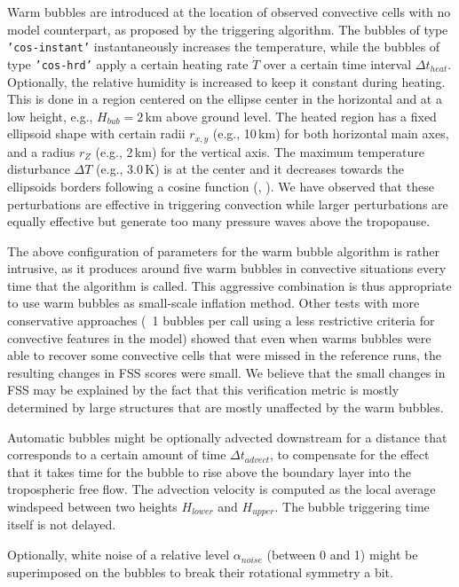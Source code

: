 \documentclass[10pt,a4paper,twoside,headinclude,footinclude,parskip=half]{scrartcl}
\newcommand{\citeNPK}[1]{\citeauthor{#1}, \citeyear{#1}}
\newcommand{\srcform}[1]{\mbox{\texttt{#1}}\xspace}%
\begin{document}
Warm bubbles are introduced at the location of observed convective cells with no model counterpart,
as proposed by the triggering algorithm. The bubbles of type \srcform{'cos-instant'} instantaneously increases
the temperature, while the bubbles of type \srcform{'cos-hrd'} apply a certain heating
rate $\dot{T}$ over a certain time interval $\Delta t_{heat}$. Optionally, the relative humidity is increased to keep it constant during heating.
This is done in a region centered on the ellipse center
in the horizontal and at a low height, e.g., $H_{bub}=2\,$km above ground level.
The heated region has a fixed ellipsoid shape with certain radii $r_{x,y}$ (e.g., 10\,km) for both horizontal main axes,
and a radius $r_Z$ (e.g., 2\,km) for the vertical axis.  The maximum temperature disturbance $\Delta T$ (e.g., 3.0\,K)
is at the center and it decreases towards the ellipsoids borders following a cosine function (\citeNPK{weisman1982}).
We have observed that these perturbations are effective in triggering convection while larger
perturbations are equally effective but generate too many pressure waves above the tropopause.

The above configuration of parameters for the warm bubble algorithm is rather intrusive,
as it produces around five warm bubbles in convective situations every time that the algorithm is called. 
This aggressive combination is thus appropriate to use warm bubbles as small-scale inflation method.
Other tests with more conservative approaches (~1 bubbles per call using a less restrictive criteria
for convective features in the model) showed that even when warms bubbles were able to recover some
convective cells that were missed in the reference runs, the resulting changes in FSS scores were small.
We believe that the small changes in FSS may be explained by the fact that this verification metric is
mostly determined by large structures that are mostly unaffected by the warm bubbles. 

Automatic bubbles might be optionally advected downstream for a distance that corresponds to a certain amount of time $\Delta t_{advect}$, to compensate
for the effect that it takes time for the bubble to rise above the boundary layer into
the tropospheric free flow. The advection velocity is computed as the local average windspeed
between two heights $H_{lower}$ and $H_{upper}$. The bubble triggering time itself is not delayed.

Optionally, white noise of a relative level $\alpha_{noise}$ (between 0 and 1) might be superimposed
on the bubbles to break their rotational symmetry a bit.
\end{document}
